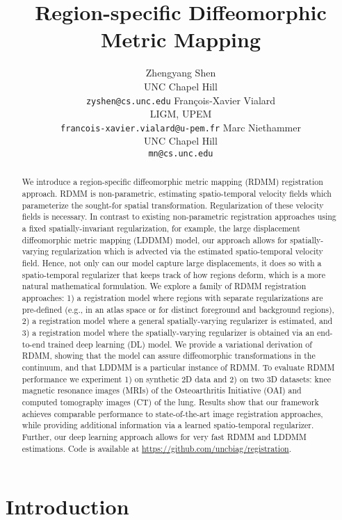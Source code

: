 \documentclass{article}
\title{Region-specific Diffeomorphic Metric Mapping}
\author{
  Zhengyang Shen \\
  UNC Chapel Hill\\
  {\tt\small zyshen@cs.unc.edu} 
  \And 
   François-Xavier Vialard \\
   LIGM, UPEM \\
   {\tt\small francois-xavier.vialard@u-pem.fr}
   \And 
   Marc Niethammer \\
   UNC Chapel Hill \\
   {\tt\small mn@cs.unc.edu}
}
\numberwithin{equation}{section}
\newcommand{\eg}{{e.g.}}
\begin{document}
\maketitle

\begin{abstract}


 
 We introduce a region-specific diffeomorphic metric mapping (RDMM) registration approach. RDMM is non-parametric, estimating spatio-temporal velocity fields which parameterize the sought-for spatial transformation. Regularization of these velocity fields is necessary. In contrast to existing non-parametric registration approaches using a fixed spatially-invariant regularization, for example, the large displacement diffeomorphic metric mapping (LDDMM) model, our approach allows for spatially-varying regularization which is advected via the estimated spatio-temporal velocity field. Hence, not only can our model capture large displacements, it does so with a spatio-temporal regularizer that keeps track of how regions deform, which is a more natural mathematical formulation. We explore a family of RDMM registration approaches: 1) a registration model where regions with separate regularizations are pre-defined (\eg, in an atlas space or for distinct foreground and background regions), 2) a registration model where a general spatially-varying regularizer is estimated, and 3) a registration model where the spatially-varying regularizer is obtained via an end-to-end trained deep learning (DL) model. We provide a variational derivation of RDMM, showing that the model can assure diffeomorphic transformations in the continuum, and that LDDMM is a particular instance of RDMM. To evaluate RDMM performance we experiment 1) on synthetic 2D data and 2) on two 3D datasets: knee magnetic resonance images (MRIs) of the Osteoarthritis Initiative (OAI) and computed tomography images (CT) of the lung. Results show that our framework achieves comparable performance to state-of-the-art image registration approaches, while providing additional information via a learned spatio-temporal regularizer. Further, our deep learning approach allows for very fast RDMM and LDDMM estimations. Code is available at \url{https://github.com/uncbiag/registration}.
  
  
\end{abstract}

\section{Introduction}
\end{document}

